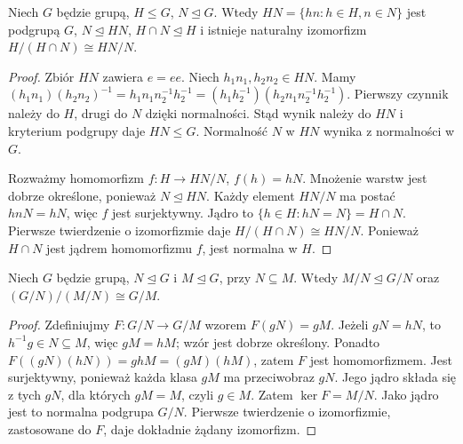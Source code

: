 \begin{twierdzenie}
\label{aa:tw:izo-drugie}
Niech $G$ będzie grupą, $H\le G$, $N\trianglelefteq G$.
Wtedy $HN=\{hn:h\in H,n\in N\}$ jest podgrupą $G$,
$N\trianglelefteq HN$, $H\cap N\trianglelefteq H$ i istnieje
naturalny izomorfizm $H/(H\cap N)\cong HN/N$.
\end{twierdzenie}
\begin{proof}
Zbiór $HN$ zawiera $e=ee$. Niech $h_1n_1,h_2n_2\in HN$.
Mamy
$(h_1n_1)(h_2n_2)^{-1}
=h_1n_1n_2^{-1}h_2^{-1}
=(h_1h_2^{-1})(h_2n_1n_2^{-1}h_2^{-1})$.
Pierwszy czynnik należy do $H$, drugi do $N$ dzięki normalności.
Stąd wynik należy do $HN$ i kryterium podgrupy daje $HN\le G$.
Normalność $N$ w $HN$ wynika z normalności w $G$.

Rozważmy homomorfizm $f:H\to HN/N$,
$f(h)=hN$. Mnożenie warstw jest dobrze określone,
ponieważ $N\trianglelefteq HN$. Każdy element $HN/N$
ma postać $hnN=hN$, więc $f$ jest surjektywny.
Jądro to $\{h\in H:hN=N\}=H\cap N$.
Pierwsze twierdzenie o izomorfizmie daje
$H/(H\cap N)\cong HN/N$. Ponieważ $H\cap N$ jest
jądrem homomorfizmu $f$, jest normalna w $H$.
\end{proof}

\begin{twierdzenie}
\label{aa:tw:izo-trzecie}
Niech $G$ będzie grupą, $N\trianglelefteq G$ i $M\trianglelefteq G$,
przy $N\subseteq M$. Wtedy $M/N\trianglelefteq G/N$ oraz
$(G/N)/(M/N)\cong G/M$.
\end{twierdzenie}
\begin{proof}
Zdefiniujmy $F:G/N\to G/M$ wzorem $F(gN)=gM$.
Jeżeli $gN=hN$, to $h^{-1}g\in N\subseteq M$,
więc $gM=hM$; wzór jest dobrze określony.
Ponadto $F((gN)(hN))=ghM=(gM)(hM)$,
zatem $F$ jest homomorfizmem.
Jest surjektywny, ponieważ każda klasa $gM$ ma
przeciwobraz $gN$. Jego jądro składa się z tych $gN$,
dla których $gM=M$, czyli $g\in M$.
Zatem $\ker F=M/N$. Jako jądro jest to normalna podgrupa $G/N$.
Pierwsze twierdzenie o izomorfizmie, zastosowane do $F$,
daje dokładnie żądany izomorfizm.
\end{proof}

